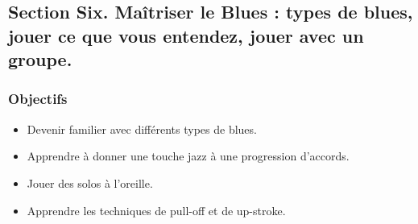 \documentclass[a4paper]{book}
\begin{document}
\subsection{Section Six. Maîtriser le Blues : types de blues, jouer ce que vous entendez, jouer avec un groupe.}
\subsubsection{Objectifs}
\begin{itemize}
\item Devenir familier avec différents types de blues.
\item Apprendre à donner une touche jazz à une progression d'accords.
\item Jouer des solos à l'oreille.
\item Apprendre les techniques de pull-off et de up-stroke.
\end{itemize}
\end{document}
